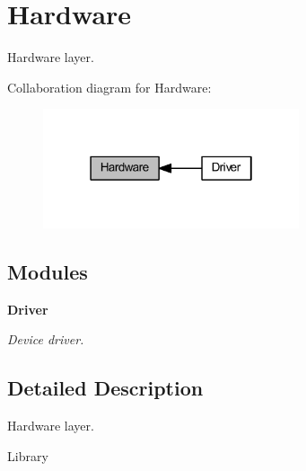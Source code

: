 \section{Hardware}
\label{group___hardware}


Hardware layer.  


Collaboration diagram for Hardware\+:\nopagebreak
\begin{figure}[H]
\begin{center}
\leavevmode
\includegraphics[width=214pt]{group___hardware}
\end{center}
\end{figure}
\subsection*{Modules}
\begin{DoxyCompactItemize}
\item 
\textbf{ Driver}
\begin{DoxyCompactList}\small\item\em Device driver. \end{DoxyCompactList}\end{DoxyCompactItemize}


\subsection{Detailed Description}
Hardware layer. 

Library 